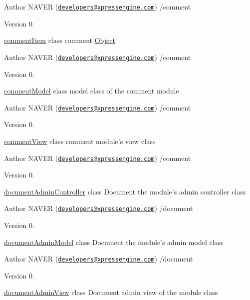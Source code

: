 \begin{DoxyAuthor}{Author}
N\-A\-V\-E\-R (\href{mailto:developers@xpressengine.com}{\tt developers@xpressengine.\-com}) /comment 
\end{DoxyAuthor}
\begin{DoxyVersion}{Version}
0.
\end{DoxyVersion}
\hyperlink{classcommentItem}{comment\-Item} class comment \hyperlink{classObject}{Object}

\begin{DoxyAuthor}{Author}
N\-A\-V\-E\-R (\href{mailto:developers@xpressengine.com}{\tt developers@xpressengine.\-com}) /comment 
\end{DoxyAuthor}
\begin{DoxyVersion}{Version}
0.
\end{DoxyVersion}
\hyperlink{classcommentModel}{comment\-Model} class model class of the comment module

\begin{DoxyAuthor}{Author}
N\-A\-V\-E\-R (\href{mailto:developers@xpressengine.com}{\tt developers@xpressengine.\-com}) /comment 
\end{DoxyAuthor}
\begin{DoxyVersion}{Version}
0.
\end{DoxyVersion}
\hyperlink{classcommentView}{comment\-View} class comment module's view class

\begin{DoxyAuthor}{Author}
N\-A\-V\-E\-R (\href{mailto:developers@xpressengine.com}{\tt developers@xpressengine.\-com}) /comment 
\end{DoxyAuthor}
\begin{DoxyVersion}{Version}
0.
\end{DoxyVersion}
\hyperlink{classdocumentAdminController}{document\-Admin\-Controller} class Document the module's admin controller class

\begin{DoxyAuthor}{Author}
N\-A\-V\-E\-R (\href{mailto:developers@xpressengine.com}{\tt developers@xpressengine.\-com}) /document 
\end{DoxyAuthor}
\begin{DoxyVersion}{Version}
0.
\end{DoxyVersion}
\hyperlink{classdocumentAdminModel}{document\-Admin\-Model} class Document the module's admin model class

\begin{DoxyAuthor}{Author}
N\-A\-V\-E\-R (\href{mailto:developers@xpressengine.com}{\tt developers@xpressengine.\-com}) /document 
\end{DoxyAuthor}
\begin{DoxyVersion}{Version}
0.
\end{DoxyVersion}
\hyperlink{classdocumentAdminView}{document\-Admin\-View} class Document admin view of the module class

